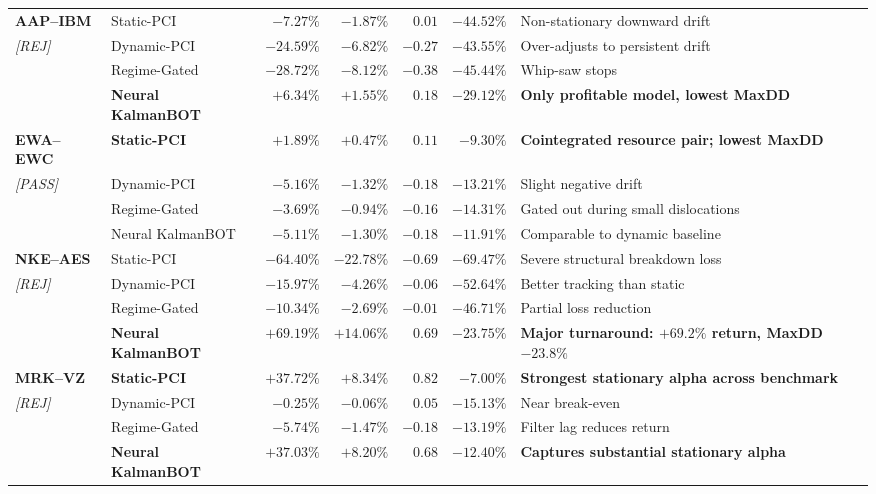 \documentclass[11pt, a4paper]{article}
\begin{document}
\begin{center}
\begin{longtable}{llrrrrp{4.8cm}}
\textbf{AAP--IBM} & Static-PCI & $-7.27\%$ & $-1.87\%$ & $0.01$ & $-44.52\%$ & Non-stationary downward drift \\
\small\textit{[REJ]} & Dynamic-PCI & $-24.59\%$ & $-6.82\%$ & $-0.27$ & $-43.55\%$ & Over-adjusts to persistent drift \\
 & Regime-Gated & $-28.72\%$ & $-8.12\%$ & $-0.38$ & $-45.44\%$ & Whip-saw stops \\
 & \textbf{Neural KalmanBOT} & $\mathbf{+6.34\%}$ & $\mathbf{+1.55\%}$ & $\mathbf{0.18}$ & $\mathbf{-29.12\%}$ & \textbf{Only profitable model, lowest MaxDD} \\
\midrule
\textbf{EWA--EWC} & \textbf{Static-PCI} & $\mathbf{+1.89\%}$ & $\mathbf{+0.47\%}$ & $\mathbf{0.11}$ & $\mathbf{-9.30\%}$ & \textbf{Cointegrated resource pair; lowest MaxDD} \\
\small\textit{[PASS]} & Dynamic-PCI & $-5.16\%$ & $-1.32\%$ & $-0.18$ & $-13.21\%$ & Slight negative drift \\
 & Regime-Gated & $-3.69\%$ & $-0.94\%$ & $-0.16$ & $-14.31\%$ & Gated out during small dislocations \\
 & Neural KalmanBOT & $-5.11\%$ & $-1.30\%$ & $-0.18$ & $-11.91\%$ & Comparable to dynamic baseline \\
\midrule
\textbf{NKE--AES} & Static-PCI & $-64.40\%$ & $-22.78\%$ & $-0.69$ & $-69.47\%$ & Severe structural breakdown loss \\
\small\textit{[REJ]} & Dynamic-PCI & $-15.97\%$ & $-4.26\%$ & $-0.06$ & $-52.64\%$ & Better tracking than static \\
 & Regime-Gated & $-10.34\%$ & $-2.69\%$ & $-0.01$ & $-46.71\%$ & Partial loss reduction \\
 & \textbf{Neural KalmanBOT} & $\mathbf{+69.19\%}$ & $\mathbf{+14.06\%}$ & $\mathbf{0.69}$ & $\mathbf{-23.75\%}$ & \textbf{Major turnaround: $+69.2\%$ return, MaxDD $-23.8\%$} \\
\midrule
\textbf{MRK--VZ} & \textbf{Static-PCI} & $\mathbf{+37.72\%}$ & $\mathbf{+8.34\%}$ & $\mathbf{0.82}$ & $\mathbf{-7.00\%}$ & \textbf{Strongest stationary alpha across benchmark} \\
\small\textit{[REJ]} & Dynamic-PCI & $-0.25\%$ & $-0.06\%$ & $0.05$ & $-15.13\%$ & Near break-even \\
 & Regime-Gated & $-5.74\%$ & $-1.47\%$ & $-0.18$ & $-13.19\%$ & Filter lag reduces return \\
 & \textbf{Neural KalmanBOT} & $\mathbf{+37.03\%}$ & $\mathbf{+8.20\%}$ & $\mathbf{0.68}$ & $\mathbf{-12.40\%}$ & \textbf{Captures substantial stationary alpha} \\

\end{longtable}
\end{center}
\end{document}
